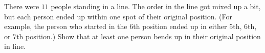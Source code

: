 There were $11$ people standing in a line. The order in the line got mixed up a bit, but each person ended up within one spot of their original position. (For example, the person who started in the $6$th position ended up in either $5$th, $6$th, or $7$th position.) Show that at least one person bends up in their original position in line.
